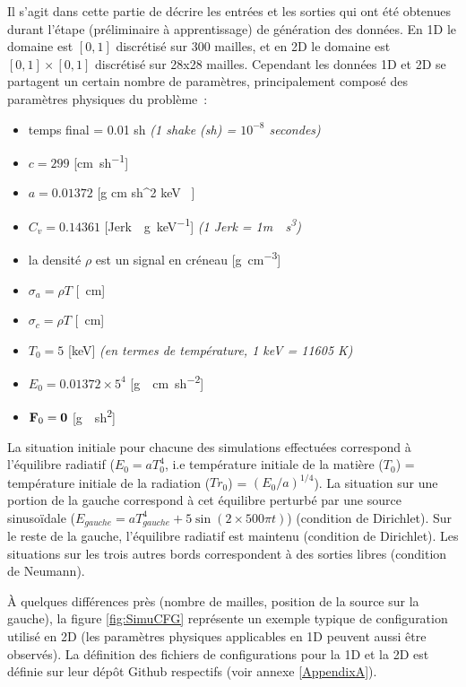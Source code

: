 Il s'agit dans cette partie de décrire les entrées et les sorties qui ont été obtenues durant l'étape (préliminaire à apprentissage) de génération des données. En 1D le domaine est $[0,1]$ discrétisé sur 300 mailles, et en 2D le domaine est $[0,1] \times [0,1]$ discrétisé sur 28x28 mailles. Cependant les données 1D et 2D se partagent un certain nombre de paramètres, principalement composé des paramètres physiques du problème :
\begin{itemize}
  \item temps final = 0.01 \si{sh} \textit{(1 shake (\si{sh}) = $10^{-8}$ secondes)}
  \item $c = 299$ [\si{\cm \per sh}]
  \item $a = 0.01372$ [\si{g \per cm \per sh^2  \per keV }]
  \item $C_v = 0.14361$ [\si{Jerk \per\g \per keV}] \textit{(1 \si{Jerk} = 1\si{m \per \s\cubed})}
  \item la densité $\rho$ est un signal en créneau [\si{\g\per\cm\cubed}]
  \item $\sigma_a = \rho T$ [\si{\per\cm}]
  \item $\sigma_c = \rho T$ [\si{\per\cm}]
  \item $T_0 = 5$ [\si{keV}] \textit{(en termes de température, 1 \si{keV} = 11605 \si{K})}
  \item $E_0 = 0.01372\times 5^4$ [\si{g \per \cm \per sh^2}]
  \item $\mathbf{F}_0 = \mathbf{0}$ [\si{g \per sh^2}]
\end{itemize}

La situation initiale pour chacune des simulations effectuées correspond à l'équilibre radiatif ($E_0=aT_0^4$, i.e température initiale de la matière ($T_0$) = température initiale de la radiation ($Tr_0$) = $(E_0/a)^{1/4}$). La situation sur une portion de la gauche correspond à cet équilibre perturbé par une source sinusoïdale ($ E_{gauche} = aT_{gauche}^4 + 5 \sin (2 \times 500 \pi t) $) (condition de Dirichlet). Sur le reste de la gauche, l'équilibre radiatif est maintenu (condition de Dirichlet). Les situations sur les trois autres bords correspondent à des sorties libres (condition de Neumann).

À quelques différences près (nombre de mailles, position de la source sur la gauche), la figure \ref{fig:SimuCFG} représente un exemple typique de configuration utilisé en 2D (les paramètres physiques applicables en 1D peuvent aussi être observés). La définition des fichiers de configurations pour la 1D et la 2D est définie sur leur dépôt Github respectifs (voir annexe \ref{AppendixA}).


